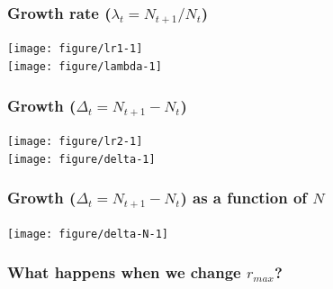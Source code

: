 \documentclass[color=usenames,dvipsnames]{beamer}\usepackage[]{graphicx}\usepackage[]{color}
\begin{document}



\begin{frame}[fragile]
  \frametitle{Growth rate ($\lambda_t = N_{t+1}/N_t$)}


\begin{center}
  \texttt{[image: figure/lr1-1]} \\ \vfill
  \texttt{[image: figure/lambda-1]}
\end{center}
\end{frame}







\begin{frame}[fragile]
  \frametitle{Growth ($\Delta_t=N_{t+1}-N_t$)}


\begin{center}
  \texttt{[image: figure/lr2-1]} \\ \vfill
  \texttt{[image: figure/delta-1]}
\end{center}
\end{frame}



\begin{frame}[fragile]
  \frametitle{Growth ($\Delta_t=N_{t+1}-N_t$) as a function of $N$}

\begin{center}
  \texttt{[image: figure/delta-N-1]}
\end{center}
\end{frame}






\begin{frame}[fragile]
  \frametitle{What happens when we change $r_{max}$?}





\begin{center}
\end{center}
\end{frame}
\end{document}
